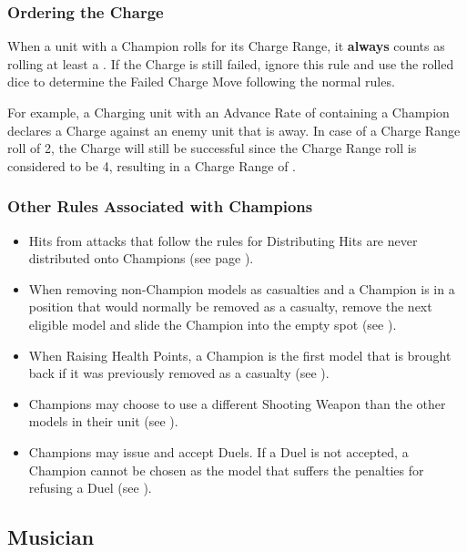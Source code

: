 \subsubsection{Ordering the Charge}
\label{ordering_the_charge}

When a unit with a Champion rolls for its Charge Range, it \textbf{always} counts as rolling at least a . If the Charge is still failed, ignore this rule and use the rolled dice to determine the Failed Charge Move following the normal rules.

For example, a Charging unit with an Advance Rate of  containing a Champion declares a Charge against an enemy unit that is  away. In case of a Charge Range roll of 2, the Charge will still be successful since the Charge Range roll is considered to be 4, resulting in a Charge Range of .

\subsubsection{Other Rules Associated with Champions}
\label{other_rules_associated_with_champions}

\begin{itemize}
\item Hits from attacks that follow the rules for Distributing Hits are never distributed onto Champions (see page \pageref{distributing_hits}).
\item When removing non-Champion \rnf{} models as casualties and a Champion is in a position that would normally be removed as a casualty, remove the next eligible \rnf{} model and slide the Champion into the empty spot (see ).
\item When Raising Health Points, a Champion is the first model that is brought back if it was previously removed as a casualty (see ).
\item Champions may choose to use a different Shooting Weapon than the other \rnf{} models in their unit (see ).
\item Champions may issue and accept Duels. If a Duel is not accepted, a Champion cannot be chosen as the model that suffers the penalties for refusing a Duel (see ).
\end{itemize}

\subsection{Musician}
\label{musician}

